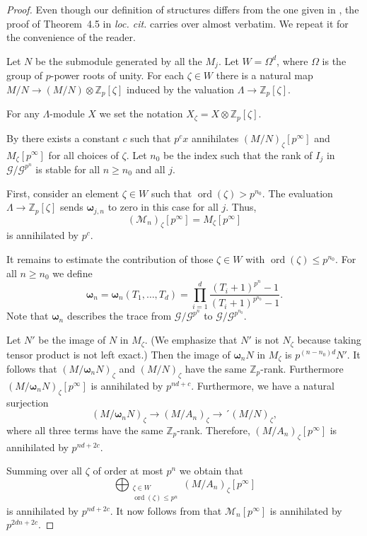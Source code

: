 \documentclass{amsart}
\numberwithin{equation}{section}
\theoremstyle{remark}
\newcommand{\ord}{\operatorname{ord}}
\newcommand{\Z}{\mathbb{Z}}
\newcommand{\bomega}{\boldsymbol{\omega}}
\theoremstyle{plain} %
\begin{document}
\begin{proof}
Even though our definition of structures differs from the one given in \cite{cuoco-monsky}, the proof of Theorem~4.5 in \emph{loc. cit.} carries over almost verbatim.
We repeat it for the convenience of the reader. 

Let $N$ be the submodule generated by all the $M_{{j}}$.
Let $W=\Omega^d$, where $\Omega$ is the group of $p$-power roots of unity.
For each $\zeta\in W$ there is a natural map $M/N\to (M/N)\otimes \Z_p[\zeta]$ induced by the valuation $\Lambda\to \Z_p[\zeta]$.

\smallskip
{For any $\Lambda$-module $X$ we set the notation $X_{\zeta} = X \otimes \Z_p[\zeta]$.}

\smallskip

By \cite[Lemma~2.6]{cuoco-monsky} there exists a  constant $c$ such that $p^cx$ annihilates $(M/N)_\zeta[p^\infty]$ and $M_\zeta[p^\infty]$ for all choices of $\zeta$.
Let $n_0$ be the index such that the rank of $I_{{j}}$ in $\mathcal{G}/\mathcal{G}^{p^n}$ is stable for all $n\ge n_0$ {and all $j$}.

{First, consider an element} $\zeta\in W$ such that $\ord(\zeta)>p^{n_0}$.
The evaluation $\Lambda\to \Z_p[\zeta]$ sends $\bomega_{j,n}$ to zero in this case {for all $j$}.
Thus,
\[
(\mathcal{M}_n)_{\zeta}[p^\infty]=M_\zeta[p^\infty]
\]
is annihilated by $p^c$.

It remains to estimate the contribution of those $\zeta\in W$ with $\ord(\zeta)\le p^{n_0}$.
For all $n\ge n_0$ we define
\[
\bomega_n {= \bomega_n(T_1, \ldots, T_d)} =\prod_{i=1}^d\frac{(T_i+1)^{p^n}-1}{(T_i+1)^{p^{n_0}}-1}.
\]
Note that $\bomega_n$ describes the trace from $\mathcal{G}/\mathcal{G}^{p^n}$ to $\mathcal{G}/\mathcal{G}^{p^{n_0}}$.

Let $N'$ be the image of $N$ in $M_\zeta$.
(We emphasize that $N'$ is not $N_\zeta$ because taking tensor product is not left exact.)
Then the image of $\bomega_n N$ in $M_\zeta$ is $p^{(n-n_0)d}N'$.
It follows that $(M/\bomega_n N)_\zeta$ and $(M/N)_\zeta$ have the same $\Z_p$-rank.
Furthermore $(M/\bomega _n N)_\zeta[p^\infty]$ is annihilated by $p^{nd+c}$. 
Furthermore, we have a natural surjection
\[
(M/\bomega{_n} N)_\zeta \longrightarrow (M/A_n)_\zeta \longrightarrow ´(M/N)_\zeta,
\]
where all three terms have the same $\Z_p$-rank.
Therefore, $(M/A_n)_\zeta[p^\infty]$ is annihilated by $p^{nd+2c}$. 

Summing over all $\zeta$ of order at most $p^n$ we obtain that 
\[
\bigoplus _{\substack{\zeta \in W\\ \ord(\zeta)\le p^n}}(M/A_n)_\zeta[p^\infty]
\]
is annihilated by $p^{nd+2c}$.
It now follows from \cite[Lemma~2.7]{cuoco-monsky} that $\mathcal{M}_n[p^\infty]$ is annihilated by $p^{2dn+2c}$.
\end{proof}
\end{document}
